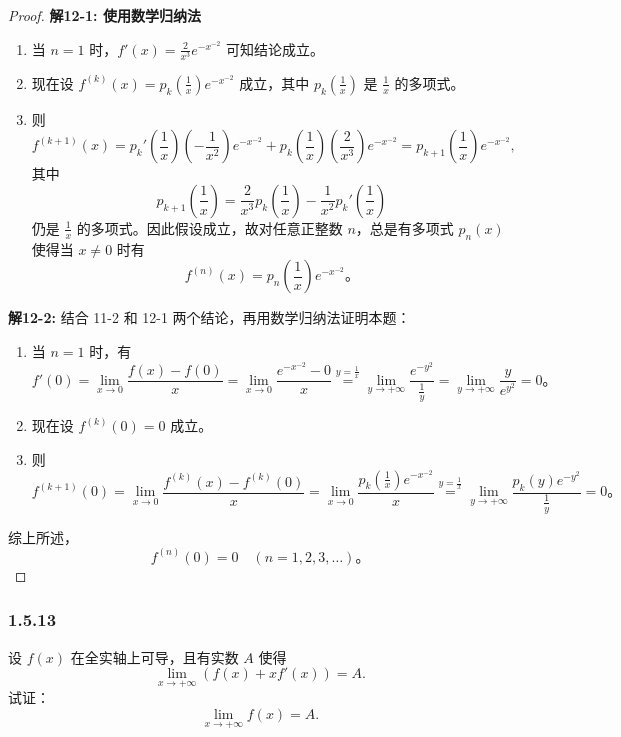\documentclass[12pt]{ctexart}
\begin{document}
\begin{proof}
\textbf{解12-1: 使用数学归纳法}
\begin{enumerate}
    \item 当 $n=1$ 时，$f'(x) = \frac{2}{x^3}e^{-x^{-2}}$ 可知结论成立。
    \item 现在设 $f^{(k)}(x) = p_k\left(\frac{1}{x}\right)e^{-x^{-2}}$ 成立，其中 $p_k\left(\frac{1}{x}\right)$ 是 $\frac{1}{x}$ 的多项式。
    \item 则
    \[
    f^{(k+1)}(x) = p_k'\left(\frac{1}{x}\right)\left(-\frac{1}{x^2}\right)e^{-x^{-2}} + p_k\left(\frac{1}{x}\right)\left(\frac{2}{x^3}\right)e^{-x^{-2}} = p_{k+1}\left(\frac{1}{x}\right)e^{-x^{-2}},
    \]
    其中
    \[
    p_{k+1}\left(\frac{1}{x}\right) = \frac{2}{x^3}p_k\left(\frac{1}{x}\right) - \frac{1}{x^2}p_k'\left(\frac{1}{x}\right)
    \]
    仍是 $\frac{1}{x}$ 的多项式。因此假设成立，故对任意正整数 $n$，总是有多项式 $p_n(x)$ 使得当 $x \neq 0$ 时有
    \[
    f^{(n)}(x) = p_n\left(\frac{1}{x}\right)e^{-x^{-2}}。
    \]
\end{enumerate}

\textbf{解12-2:}
结合 11-2 和 12-1 两个结论，再用数学归纳法证明本题：
\begin{enumerate}
    \item 当 $n=1$ 时，有
    \[
    f'(0) = \lim_{x \to 0} \frac{f(x) - f(0)}{x} = \lim_{x \to 0} \frac{e^{-x^{-2}} - 0}{x} \overset{y = \frac{1}{x}}{=} \lim_{y \to +\infty} \frac{e^{-y^2}}{\frac{1}{y}} = \lim_{y \to +\infty} \frac{y}{e^{y^2}} = 0。
    \]
    \item 现在设 $f^{(k)}(0) = 0$ 成立。
    \item 则
    \[
    f^{(k+1)}(0) = \lim_{x \to 0} \frac{f^{(k)}(x) - f^{(k)}(0)}{x} = \lim_{x \to 0} \frac{p_k\left(\frac{1}{x}\right)e^{-x^{-2}}}{x} \overset{y = \frac{1}{x}}{=} \lim_{y \to +\infty} \frac{p_k(y)e^{-y^2}}{\frac{1}{y}} = 0。
    \]
\end{enumerate}

综上所述，
\[
f^{(n)}(0) = 0 \quad (n = 1, 2, 3, \dots)。
\]
\end{proof}

\subsubsection*{1.5.13}

设 $f(x)$ 在全实轴上可导，且有实数 $A$ 使得
\[
\lim_{x \to +\infty} \left( f(x) + x f'(x) \right) = A.
\]
试证：
\[
\lim_{x \to +\infty} f(x) = A.
\]
\end{document}
